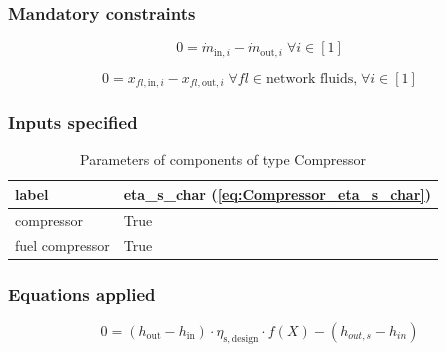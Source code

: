 \subsubsection{Mandatory constraints}

\begin{equation}
\label{eq:Compressor_mass_flow_constraints}
0=\dot{m}_{\mathrm{in,}i}-\dot{m}_{\mathrm{out,}i}\; \forall i \in [1]
\end{equation}

\begin{equation}
\label{eq:Compressor_fluid_constraints}
0=x_{fl\mathrm{,in,}i}-x_{fl\mathrm{,out,}i}\;\forall fl \in\text{network fluids,}\; \forall i \in [1]
\end{equation}


\subsubsection{Inputs specified}

\begin{table}[H]\begin{center}
\begin{tabular}{ll}
\toprule
           label &  eta\_s\_char (\ref{eq:Compressor_eta_s_char}) \\
\midrule
      compressor &                                           True \\
 fuel compressor &                                           True \\
\bottomrule
\end{tabular}
\caption{Parameters of components of type Compressor}
\end{center}\end{table}

\subsubsection{Equations applied}

\begin{equation}
\label{eq:Compressor_eta_s_char}
0=\left(h_\mathrm{out}-h_\mathrm{in}\right)\cdot\eta_\mathrm{s,design}\cdot f\left(X\right)-\left( h_{out,s} - h_{in} \right)
\end{equation}

